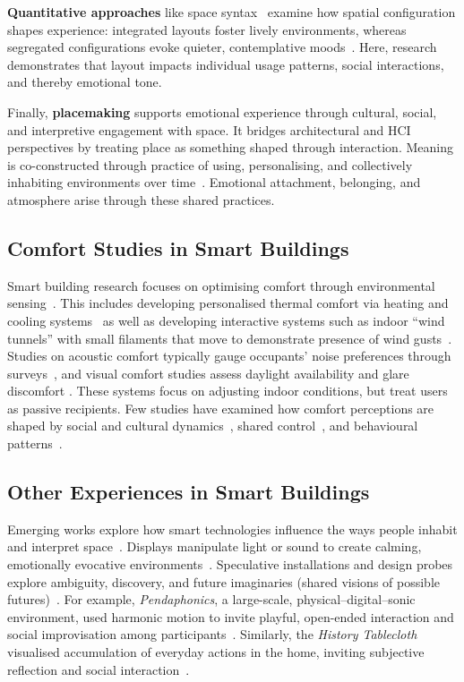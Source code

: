 \textbf{Quantitative approaches} like space syntax~\cite{hillier2008space, hillier1976space} examine how spatial configuration shapes experience: integrated layouts foster lively environments, whereas segregated configurations evoke quieter, contemplative moods~\cite{jens2021design}. Here, research demonstrates that layout impacts individual usage patterns, social interactions, and thereby emotional tone.

Finally, \textbf{placemaking} supports emotional experience through cultural, social, and interpretive engagement with space. It bridges architectural and HCI perspectives by treating place as something shaped through interaction. Meaning is co-constructed through practice of using, personalising, and collectively inhabiting environments over time~\cite{dourish2001action, harrison1996re}. Emotional attachment, belonging, and atmosphere arise through these shared practices.


\subsection{Comfort Studies in Smart Buildings}
\label{subsec:ch3-comfort-studies}
Smart building research focuses on optimising comfort through environmental sensing~\cite{alavi2017comfort, alavi2020five}. This includes developing personalised thermal comfort via heating and cooling systems~\cite{jazizadeh2014human, khare2023thermal} as well as developing interactive systems such as indoor ``wind tunnels'' with small filaments that move to demonstrate presence of wind gusts~\cite{zhong2020hilo, snow2019performance, gaver2013indoor}. Studies on acoustic comfort typically gauge occupants' noise preferences through surveys~\cite{marques2020real, choi2009decision}, and visual comfort studies assess daylight availability and glare discomfort \cite{bian2023simulation, zheng2023daylighting}. These systems focus on adjusting indoor conditions, but treat users as passive recipients. Few studies have examined how comfort perceptions are shaped by social and cultural dynamics~\cite{clear2018thermokiosk}, shared control~\cite{von2021towards}, and behavioural patterns~\cite{clear2017d}. 

\subsection{Other Experiences in Smart Buildings}
Emerging works explore how smart technologies influence the ways people inhabit and interpret space~\cite{rao2025designing, wiberg2020interaction}. Displays manipulate light or sound to create calming, emotionally evocative environments~\cite{feng2019livenature, behrens2018sentiment, rao2023towards}. Speculative installations and design probes explore ambiguity, discovery, and future imaginaries (shared visions of possible futures)~\cite{gaver2006history, wiberg2020interaction}. For example, \emph{Pendaphonics}, a large-scale, physical–digital–sonic environment, used harmonic motion to invite playful, open-ended interaction and social improvisation among participants~\cite{hansen2009pendaphonics}. Similarly, the \emph{History Tablecloth} visualised accumulation of everyday actions in the home, inviting subjective reflection and social interaction~\cite{gaver2006history}.

